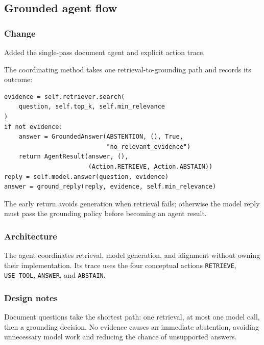 
\subsection{Grounded agent flow}


\subsubsection{Change}

Added the single-pass document agent and explicit action trace.

The coordinating method takes one retrieval-to-grounding path and records its outcome:

\begin{verbatim}
evidence = self.retriever.search(
    question, self.top_k, self.min_relevance
)
if not evidence:
    answer = GroundedAnswer(ABSTENTION, (), True,
                            "no_relevant_evidence")
    return AgentResult(answer, (),
                       (Action.RETRIEVE, Action.ABSTAIN))
reply = self.model.answer(question, evidence)
answer = ground_reply(reply, evidence, self.min_relevance)
\end{verbatim}

The early return avoids generation when retrieval fails; otherwise the model reply must pass the grounding policy before becoming an agent result.

\subsubsection{Architecture}

The agent coordinates retrieval, model generation, and alignment without owning their implementation. Its trace uses the four conceptual actions \texttt{RETRIEVE}, \texttt{USE\_TOOL}, \texttt{ANSWER}, and \texttt{ABSTAIN}.

\subsubsection{Design notes}

Document questions take the shortest path: one retrieval, at most one model call, then a grounding decision. No evidence causes an immediate abstention, avoiding unnecessary model work and reducing the chance of unsupported answers.

